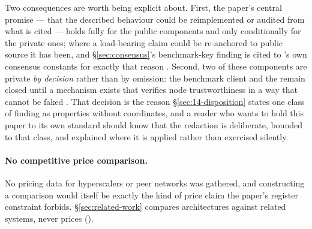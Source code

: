 Two consequences are worth being explicit about. First, the paper's central promise --- that the
described behaviour could be reimplemented or audited from what is cited --- holds fully for the
public components and only conditionally for the private ones; where a load-bearing claim could be
re-anchored to public source it has been, and \S\ref{sec:consensus}'s benchmark-key finding is
cited to \fluxd{}'s own consensus constants for exactly that reason
. Second, two of these components are
private \emph{by decision} rather than by omission: the benchmark client and the \SAS{} remain
closed until a mechanism exists that verifies node trustworthiness in a way that cannot be faked
. That decision is the reason \S\ref{sec:14-disposition} states one class of
finding as properties without coordinates, and a reader who wants to hold this paper to its own
standard should know that the redaction is deliberate, bounded to that class, and explained where it
is applied rather than exercised silently.

\paragraph{No competitive price comparison.} No pricing data for hyperscalers or peer networks was
gathered, and constructing a comparison would itself be exactly the kind of price claim the paper's
register constraint forbids. \S\ref{sec:related-work} compares architectures against related systems, never prices
().

